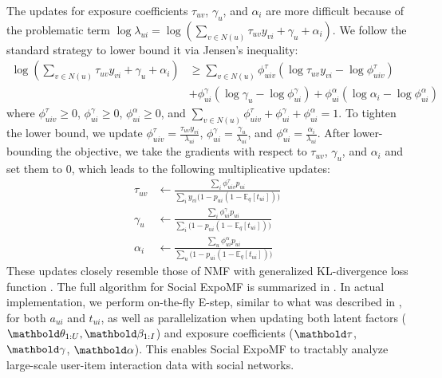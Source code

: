 The updates for exposure coefficients $\tau_{uv}$, $\gamma_u$, and $\alpha_i$ are more difficult because of the problematic term $\log \lambda_{ui} = \log (\sum_{v\in N(u)} \tau_{uv} y_{vi} + \gamma_u + \alpha_i)$. We follow the standard strategy to lower bound it via Jensen's inequality:
\begin{align*}
\log(\sum_{v\in N(u)} \tau_{uv} y_{vi} + \gamma_u + \alpha_i) &\geq \sum_{v \in N(u)} \phi^{\tau}_{uiv} (\log\tau_{uv}y_{vi} - \log \phi_{uiv}^\tau) \\
&+ \phi^\gamma_{ui} (\log \gamma_{u} - \log\phi^\gamma_{ui}) + \phi^\alpha_{ui} (\log \alpha_{i} - \log\phi^\alpha_{ui})
\end{align*}
where $\phi^\tau_{uiv} \geq 0$, $\phi^\gamma_{ui} \geq 0$, $\phi^\alpha_{ui} \geq 0$, and $\sum_{v\in N(u)} \phi^\tau_{uiv} + \phi^\gamma_{ui} + \phi^\alpha_{ui} = 1$. To tighten the lower bound, we update $\phi^\tau_{uiv}=\frac{\tau_{uv}y_{vi}}{\lambda_{ui}}$, $\phi^\gamma_{ui} = \frac{\gamma_u}{\lambda_{ui}}$, and $\phi^\alpha_{ui} = \frac{\alpha_i}{\lambda_{ui}}$. After lower-bounding the objective, we take the gradients with respect to $\tau_{uv}$, $\gamma_u$, and $\alpha_i$ and set them to $0$, which leads to the following multiplicative updates:
\begin{equation}
\begin{split}
\tau_{uv} &\leftarrow \frac{\sum_i \phi_{uiv}^\tau p_{ui}}{\sum_i y_{vi}\big(1 - p_{ui}(1 - \mathbb{E}_q[t_{ui}])\big)}\\
\gamma_{u} &\leftarrow \frac{\sum_i \phi_{ui}^\gamma p_{ui}}{\sum_i \big(1 - p_{ui} (1 - \mathbb{E}_q[t_{ui}])\big)}\\
\alpha_{i} &\leftarrow \frac{\sum_u \phi_{ui}^\alpha p_{ui}}{\sum_u \big(1 - p_{ui} (1 - \mathbb{E}_q[t_{ui}])\big)}
\end{split}
\label{chpt:expomf:eq:social_mstep}
\end{equation}
These updates closely resemble those of \gls{NMF} with generalized \gls{KL}-divergence loss function \citep{seung2001algorithms}. The full algorithm for Social ExpoMF is summarized in . In actual implementation, we perform on-the-fly E-step, similar to what was described in , for both $a_{ui}$ and $t_{ui}$, as well as parallelization when updating both latent factors ($\mb\theta_{1:U}, \mb\beta_{1:I}$) and exposure coefficients ($\mb\tau$, $\mb\gamma$, $\mb\alpha$). This enables Social ExpoMF to tractably analyze large-scale user-item interaction data with social networks. 


